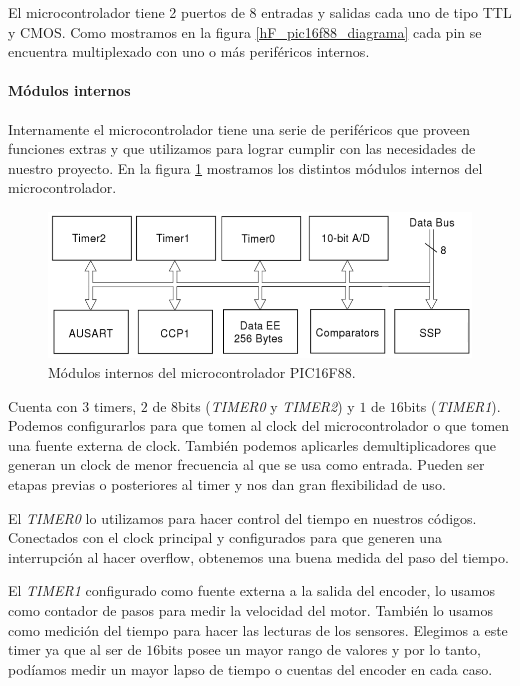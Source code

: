 El microcontrolador tiene 2 puertos de 8 entradas y salidas cada uno de tipo TTL y CMOS.
Como mostramos en la figura \ref{hF_pic16f88_diagrama} cada pin se encuentra multiplexado con uno o m\'as perif\'ericos internos.

\paragraph{M\'odulos internos}
\label{h_controlador_micro_modulos}

Internamente el microcontrolador tiene una serie de perif\'ericos que proveen funciones extras y que utilizamos para lograr
cumplir con las necesidades de nuestro proyecto.
En la figura \ref{hF_pic16f88_modulos} mostramos los distintos m\'odulos internos del microcontrolador.

\begin{figure}[b]
	\centering
	\includegraphics[scale=0.35]{figuras/pic16f88_modulos.png}
	\caption{M\'odulos internos del microcontrolador PIC16F88.}
	\label{hF_pic16f88_modulos}
\end{figure}

Cuenta con $3$ timers, $2$ de $8$bits (\emph{TIMER0} y \emph{TIMER2}) y $1$ de $16$bits (\emph{TIMER1}).
Podemos configurarlos para que tomen al clock del microcontrolador o que tomen una fuente externa de clock.
Tambi\'en podemos aplicarles demultiplicadores que generan un clock de menor frecuencia al que se usa como entrada.
Pueden ser etapas previas o posteriores al timer y nos dan gran flexibilidad de uso.

El \emph{TIMER0} lo utilizamos para hacer control del tiempo en nuestros c\'odigos.
Conectados con el clock principal y configurados para que generen una interrupci\'on al hacer overflow,
obtenemos una buena medida del paso del tiempo.

El \emph{TIMER1} configurado como fuente externa a la salida del encoder, lo usamos como contador de pasos para medir la
velocidad del motor.
Tambi\'en lo usamos como medici\'on del tiempo para hacer las lecturas de los sensores.
Elegimos a este timer ya que al ser de $16$bits posee un mayor rango de valores y por lo tanto, pod\'iamos medir un mayor lapso
de tiempo o cuentas del encoder en cada caso.

